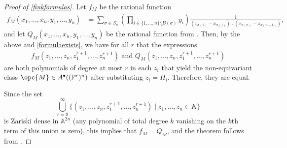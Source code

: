 \documentclass[12pt]{amsart}
\newcommand{\mb}{\mathbb}
\theoremstyle{plain}
\theoremstyle{definition}
\theoremstyle{remark}
\begin{document}
\begin{proof}[Proof of \cref{finkformulas}]

Let $f_M$ be the rational function
\begin{align*}
f_M(x_1,\ldots,x_n,y_1,\ldots,y_n) &= \sum_{\sigma \in S_n} \left(\prod_{i \in \{1,\ldots,n\}\setminus B(\sigma)} y_i\right)\frac{1}{(x_{\sigma(2)}-x_{\sigma(1)})\ldots (x_{\sigma(n)}-x_{\sigma(n-1)})},
\end{align*}
and let $Q_{M}(x_1,\ldots,x_n,y_1,\ldots,y_n)$ be the rational function from . Then, by the above and \cref{formulaexists}, we have for all $r$ that the expressions
\begin{align*}
\text{$f_M(z_1,\ldots,z_n,z_1^{r+1},\ldots,z_{n}^{r+1})$ and $Q_{M}(z_1,\ldots,z_n,z_1^{r+1},\ldots,z_n^{r+1})$}
\end{align*}
are both polynomials of degree at most $r$ in each $z_i$ that yield the non-equivariant class $\opc{M} \in A^\bullet((\mb{P}^r)^n)$ after substituting $z_i = H_i$. Therefore, they are equal.

Since the set \[\bigcup_{r=0}^\infty \{(z_1,\ldots,z_n,z_1^{r+1},\ldots,z_{n}^{r+1}) \mid z_1, \ldots, z_n \in K\}\] is Zariski dense in $\mb{A}^{2n}$ (any polynomial of total degree $k$ vanishing on the $k$th term of this union is zero), this implies that $f_M = Q_M$, and the theorem follows from .
\end{proof}
\end{document}
